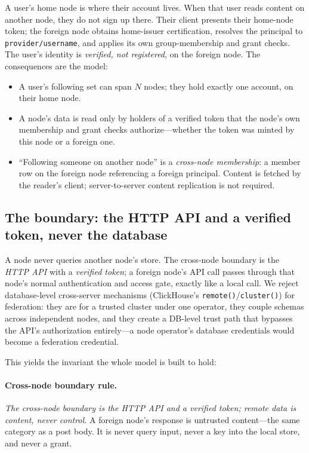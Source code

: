 \documentclass[sigconf, nonacm]{acmart}
\begin{document}
A user's home node is where their account lives. When that user reads content
on another node, they do not sign up there. Their client presents their
home-node token; the foreign node obtains home-issuer certification, resolves
the principal to \texttt{provider/username}, and applies its own
group-membership and grant checks. The user's identity is \emph{verified, not
registered}, on the foreign node. The consequences are the model:

\begin{itemize}[leftmargin=*,nosep]
  \item A user's following set can span $N$ nodes; they hold exactly one
  account, on their home node.
  \item A node's data is read only by holders of a verified token that the
  node's own membership and grant checks authorize---whether the token was
  minted by this node or a foreign one.
  \item ``Following someone on another node'' is a \emph{cross-node
  membership}: a member row on the foreign node referencing a foreign
  principal. Content is fetched by the reader's client; server-to-server
  content replication is not required.
\end{itemize}

\subsection{The boundary: the HTTP API and a verified token, never the
database}

A node never queries another node's store. The cross-node boundary is the
\emph{HTTP API} with a \emph{verified token}; a foreign node's API call
passes through that node's normal authentication and access gate, exactly
like a local call. We reject database-level cross-server mechanisms
(ClickHouse's \texttt{remote()}/\texttt{cluster()}) for federation: they are
for a trusted cluster under one operator, they couple schemas across
independent nodes, and they create a DB-level trust path that bypasses the
API's authorization entirely---a node operator's database credentials would
become a federation credential.

This yields the invariant the whole model is built to hold:

\paragraph{Cross-node boundary rule.} \emph{The cross-node boundary is the
HTTP API and a verified token; remote data is content, never control.} A
foreign node's response is untrusted content---the same category as a post
body. It is never query input, never a key into the local store, and never a
grant.
\end{document}
